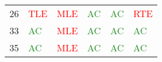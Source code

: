 \documentclass[thesis=M,english,hidelinks]{FITthesis}[2012/10/20]
\theoremstyle{definition}
\begin{document}
\begin{table}[ht]
\begin{tabular}{ m{1cm} | m{1.5cm} m{1.5cm} m{1.5cm} m{1.5cm} m{1.5cm} }
        26 & \textcolor{Red}{TLE} & \textcolor{Red}{MLE} & \textcolor{ForestGreen}{AC} & \textcolor{ForestGreen}{AC} & \textcolor{Red}{RTE} \\
        33 & \textcolor{ForestGreen}{AC} & \textcolor{Red}{MLE} & \textcolor{ForestGreen}{AC} & \textcolor{ForestGreen}{AC} & \textcolor{ForestGreen}{AC} \\
        35 & \textcolor{ForestGreen}{AC} & \textcolor{Red}{MLE} & \textcolor{ForestGreen}{AC} & \textcolor{ForestGreen}{AC} & \textcolor{ForestGreen}{AC} \\

\end{tabular}
\end{table}
\end{document}
